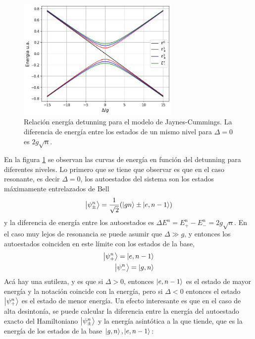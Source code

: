 \begin{figure}
    \centering
    \includegraphics[width=0.7\textwidth]{figuras/ch3/relacion energia detunning jcm simple.png}
    \caption{Relaci\'on energ\'ia detunning para el modelo de Jaynes-Cummings. La diferencia de energ\'ia entre los estados de un mismo nivel para $\Delta=0$ es $2g\sqrt{n}$.}
    \label{fig:relación energia detunning jcm1}
\end{figure}
En la figura \ref{fig:relación energia detunning jcm1} se observan las curvas de energ\'ia en funci\'on del detunning para diferentes niveles. Lo primero que se tiene que observar es que en el caso resonante, es decir $\Delta=0$, los autoestados del sistema son los estados máximamente entrelazados de Bell
\begin{equation}
    \ket{\psi_\pm^n}=\frac{1}{\sqrt{2}}(\ket{gn}\pm\ket{e,n-1})
\end{equation} 
y la diferencia de energ\'ia entre los autoestados es $\Delta E^n =E^n_+-E^n_-=2g\sqrt{n}$. En el caso muy lejos de resonancia se puede asumir que $\Delta \gg g $, y entonces los autoestados coinciden en este l\'imite con los estados de la base, 
\begin{equation}
    \begin{aligned}
        \ket{\psi^n_+}=\ket{e,n-1} \\
        \ket{\psi^n_-}=\ket{g,n}
    \end{aligned}
\end{equation}
Ac\'a hay una sutileza, y es que si $\Delta>0$, entonces $\ket{e,n-1}$ es el estado de mayor energ\'ia y la notaci\'on coincide con la energ\'ia, pero si $\Delta<0$ entonces el estado $\ket{\psi^n_+}$ es el estado de menor energ\'ia. 
Un efecto interesante es que en el caso de alta desinton\'ia, se puede calcular la diferencia entre la energía del autoestado exacto del Hamiltoniano $\ket{\psi_\pm^n}$ y la energía asintótica a la que tiende, que es la energía de los estados de la base $\ket{g,n},\ket{e,n-1}$:
